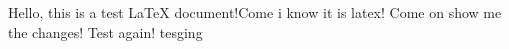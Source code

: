 \documentclass{article}
\begin{document}
Hello, this is a test LaTeX document!Come i know it is latex! Come on show me the changes! Test again!
tesging
\end{document}
